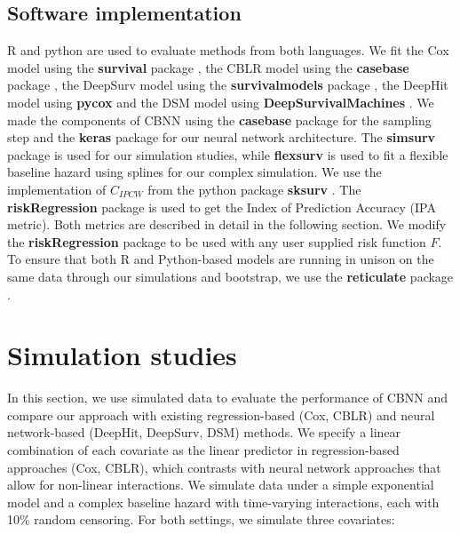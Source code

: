 \documentclass[APA,LATO1COL]{WileyNJD-v2}
\begin{document}
\hypertarget{software-implementation}{%
\subsection{Software implementation}\label{software-implementation}}

R \citep{Rsoft} and python \citep{py} are used to evaluate methods from
both languages. We fit the Cox model using the \textbf{survival} package
\citep{survpkg}, the CBLR model using the \textbf{casebase} package
\citep{cbpkg}, the DeepSurv model using the \textbf{survivalmodels}
package \citep{survmods}, the DeepHit model using \textbf{pycox}
\citep{lee2018DeepHit} and the DSM model using
\textbf{DeepSurvivalMachines} \citep{dsmPaper}. We made the components
of CBNN using the \textbf{casebase} package for the sampling step and
the \textbf{keras} \citep{keras} package for our neural network
architecture. The \textbf{simsurv} package \citep{simsurv} is used for
our simulation studies, while \textbf{flexsurv} \citep{flexsurv} is used
to fit a flexible baseline hazard using splines for our complex
simulation. We use the implementation of \(C_{IPCW}\) from the python
package \textbf{sksurv} \citep{sksurv}. The \textbf{riskRegression}
package \citep{riskRegression} is used to get the Index of Prediction
Accuracy (IPA metric). Both metrics are described in detail in the
following section. We modify the \textbf{riskRegression} package to be
used with any user supplied risk function \(F\). To ensure that both R
and Python-based models are running in unison on the same data through
our simulations and bootstrap, we use the \textbf{reticulate} package
\citep{reticulate}.







\hypertarget{sims}{%
\section{Simulation studies}\label{sims}}

In this section, we use simulated data to evaluate the performance of
CBNN and compare our approach with existing regression-based (Cox, CBLR)
and neural network-based (DeepHit, DeepSurv, DSM) methods. We specify a
linear combination of each covariate as the linear predictor in
regression-based approaches (Cox, CBLR), which contrasts with neural
network approaches that allow for non-linear interactions. We simulate
data under a simple exponential model and a complex baseline hazard with
time-varying interactions, each with 10\% random censoring. For both
settings, we simulate three covariates:
\end{document}
